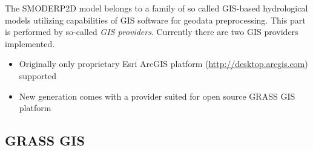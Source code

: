 

\justifying
{\rmfamily The SMODERP2D model belongs to a family of so called
GIS-based hydrological models utilizing capabilities of GIS software
for geodata preprocessing. This part is performed by so-called {\em
GIS providers}. Currently there are two GIS providers implemented.

\begin{itemize}
\item Originally only proprietary Esri ArcGIS platform (\url{http://desktop.arcgis.com}) supported
\item New generation comes with a provider suited for open source GRASS GIS platform
\end{itemize}
}

\subsection{GRASS GIS}
